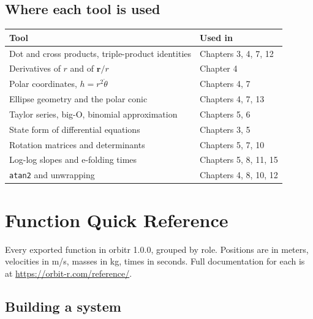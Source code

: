 \documentclass[
  10.5pt,
  letterpaper,
]{scrbook}
\newcounter{none} %
\theoremstyle{plain}
\theoremstyle{remark}
\begin{document}
\section{Where each tool is used}\label{where-each-tool-is-used}

{\def\LTcaptype{none} %
\begin{longtable}[]{@{}
  >{\raggedright\arraybackslash}p{}
  >{\raggedright\arraybackslash}p{}@{}}
\toprule\noalign{}
\begin{minipage}[b]{\linewidth}\raggedright
Tool
\end{minipage} & \begin{minipage}[b]{\linewidth}\raggedright
Used in
\end{minipage} \\
\midrule\noalign{}
\endhead
\bottomrule\noalign{}
\endlastfoot
Dot and cross products, triple-product identities & Chapters 3, 4, 7,
12 \\
Derivatives of \(r\) and of \(\mathbf{r}/r\) & Chapter 4 \\
Polar coordinates, \(h = r^2\dot\theta\) & Chapters 4, 7 \\
Ellipse geometry and the polar conic & Chapters 4, 7, 13 \\
Taylor series, big-O, binomial approximation & Chapters 5, 6 \\
State form of differential equations & Chapters 3, 5 \\
Rotation matrices and determinants & Chapters 5, 7, 10 \\
Log-log slopes and e-folding times & Chapters 5, 8, 11, 15 \\
\texttt{atan2} and unwrapping & Chapters 4, 8, 10, 12 \\
\end{longtable}
}

\chapter{Function Quick Reference}\label{sec-function-reference}

Every exported function in orbitr 1.0.0, grouped by role. Positions are
in meters, velocities in m/s, masses in kg, times in seconds. Full
documentation for each is at \url{https://orbit-r.com/reference/}.

\section{Building a system}\label{building-a-system}
\end{document}
